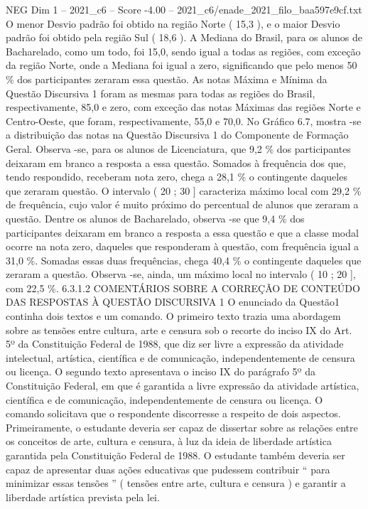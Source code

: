 \begin{textsample}{NEG Dim 1 – 2021\_c6 – Score -4.00 – 2021\_c6/enade\_2021\_filo\_baa597e9cf.txt}
O menor Desvio padrão foi obtido na região Norte ( 15,3 ), e o maior Desvio padrão foi obtido pela região Sul ( 18,6 ).
A Mediana do Brasil, para os alunos de Bacharelado, como um todo, foi 15,0, sendo igual a todas as regiões, com exceção da região Norte, onde a Mediana foi igual a zero, significando que pelo menos 50 \% dos participantes zeraram essa questão.
As notas Máxima e Mínima da Questão Discursiva 1 foram as mesmas para todas as regiões do Brasil, respectivamente, 85,0 e zero, com exceção das notas Máximas das regiões Norte e Centro-Oeste, que foram, respectivamente, 55,0 e 70,0.
No Gráfico 6.7, mostra -se a distribuição das notas na Questão Discursiva 1 do Componente de Formação Geral.
Observa -se, para os alunos de Licenciatura, que 9,2 \% dos participantes deixaram em branco a resposta a essa questão.
Somados à frequência dos que, tendo respondido, receberam nota zero, chega a 28,1 \% o contingente daqueles que zeraram questão.
O intervalo ( 20 ; 30 ] caracteriza máximo local com 29,2 \% de frequência, cujo valor é muito próximo do percentual de alunos que zeraram a questão.
Dentre os alunos de Bacharelado, observa -se que 9,4 \% dos participantes deixaram em branco a resposta a essa questão e que a classe modal ocorre na nota zero, daqueles que responderam à questão, com frequência igual a 31,0 \%.
Somadas essas duas frequências, chega 40,4 \% o contingente daqueles que zeraram a questão.
Observa -se, ainda, um máximo local no intervalo ( 10 ; 20 ], com 22,5 \%. 6.3.1.2 COMENTÁRIOS SOBRE A CORREÇÃO DE CONTEÚDO DAS RESPOSTAS À QUESTÃO DISCURSIVA 1 O enunciado da Questão1 continha dois textos e um comando.
O primeiro texto trazia uma abordagem sobre as tensões entre cultura, arte e censura sob o recorte do inciso IX do Art. 5º da Constituição Federal de 1988, que diz ser livre a expressão da atividade intelectual, artística, científica e de comunicação, independentemente de censura ou licença.
O segundo texto apresentava o inciso IX do parágrafo 5º da Constituição Federal, em que é garantida a livre expressão da atividade artística, científica e de comunicação, independentemente de censura ou licença.
O comando solicitava que o respondente discorresse a respeito de dois aspectos.
Primeiramente, o estudante deveria ser capaz de dissertar sobre as relações entre os conceitos de arte, cultura e censura, à luz da ideia de liberdade artística garantida pela Constituição Federal de 1988.
O estudante também deveria ser capaz de apresentar duas ações educativas que pudessem contribuir “ para minimizar essas tensões ” ( tensões entre arte, cultura e censura ) e garantir a liberdade artística prevista pela lei.

\end{textsample}
